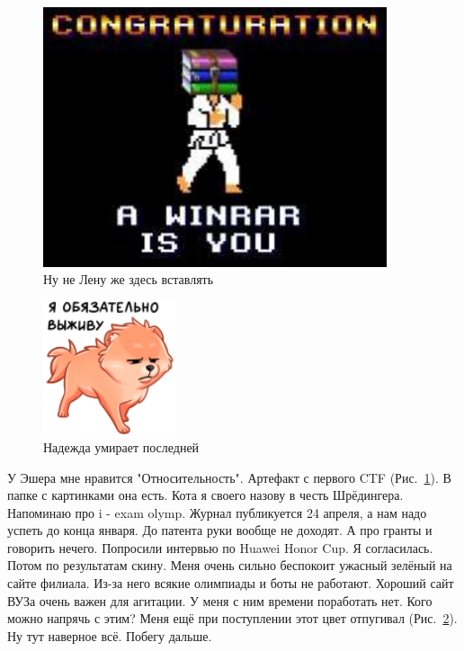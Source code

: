 \documentclass[a4paper,14pt]{extreport}
\begin{document}
\begin{figure}[t]
\begin{center}
\includegraphics[width=0.9\textwidth]{ya}
\end{center}
\caption{Ну не Лену же здесь вставлять}
\label{fig:ya}
\end{figure}

\begin{figure}
\includegraphics[width=0.35\textwidth]{a}
\caption{Надежда умирает последней}
\label{fig:a}
\end{figure}
У Эшера мне нравится "Относительность". Артефакт с первого CTF (Рис.~\ref{fig:ya}). В папке с картинками она есть. Кота я своего назову в честь Шрёдингера. Напоминаю про i - exam olymp. Журнал публикуется 24 апреля, а нам надо успеть до конца января. До патента руки вообще не доходят. А про гранты и говорить нечего. Попросили интервью по Huawei Honor Cup. Я согласилась. Потом по результатам скину. Меня очень сильно беспокоит ужасный зелёный на сайте филиала. Из-за него всякие олимпиады и боты не работают. Хороший сайт ВУЗа очень важен для агитации. У меня с ним времени поработать нет. Кого можно напрячь с этим? Меня ещё при поступлении этот цвет отпугивал (Рис.~\ref{fig:a}). Ну тут наверное всё. Побегу дальше.
\end{document}
